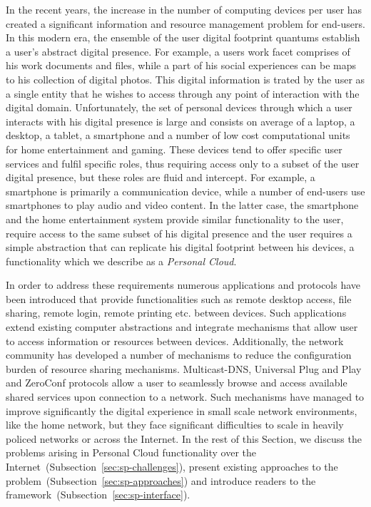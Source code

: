 In the recent years, the increase in the number of computing devices per user
has created a significant information and resource management problem for
end-users. In this modern era, the ensemble of the user digital footprint
quantums establish a user's abstract digital presence. For example, a users work
facet comprises of his work documents and files, while a part of his social
experiences can be maps to his collection of digital photos. This digital
information is trated by the user as a single entity that he wishes to access
through any point of interaction with the digital domain.  Unfortunately, the
set of personal devices through which a user interacts with his digital presence
is large and consists on average of a laptop, a desktop, a tablet, a smartphone
and a number of low cost computational units for home entertainment and gaming.
These devices tend to offer specific user services and fulfil specific roles,
thus requiring access only to a subset of the user digital presence, but these
roles are fluid and intercept. For example, a smartphone is primarily a
communication device, while a number of end-users use smartphones to play audio
and video content. In the latter case, the smartphone and the home entertainment
system provide similar functionality to the user, require access to the same
subset of his digital presence and the user requires a simple abstraction that
can replicate his digital footprint between his devices, a functionality which
we describe as a \emph{Personal Cloud}. 

In order to address these requirements numerous applications and protocols have
been introduced that provide functionalities such as remote desktop access, file
sharing, remote login, remote printing etc.  between devices.  Such applications
extend existing computer abstractions and integrate mechanisms that allow user
to access information or resources between devices.  Additionally, the network
community has developed a number of mechanisms to reduce the configuration
burden of resource sharing mechanisms.  Multicast-DNS, Universal Plug and Play
and ZeroConf protocols allow a user to seamlessly browse and access available
shared services upon connection to a network.  Such mechanisms have managed to
improve significantly the digital experience in small scale network
environments, like the home network, but they face significant difficulties to
scale in heavily policed networks or across the Internet. In the rest of this
Section, we discuss the problems arising in Personal Cloud functionality over
the Internet~(Subsection~\ref{sec:sp-challenges}), present existing approaches
to the problem~(Subsection~\ref{sec:sp-approaches}) and introduce readers to the
\signpost framework~(Subsection~\ref{sec:sp-interface}).

